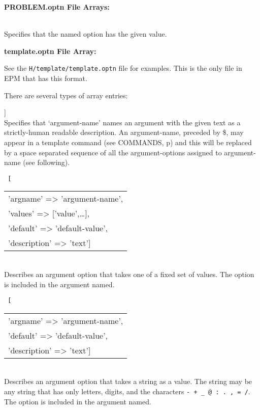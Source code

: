 \documentclass[12pt]{article}
\newenvironment{indpar}[1][0.4in]%
	{\begin{list}{}%
		     {\setlength{\itemsep}{0in}%
		      \setlength{\topsep}{0in}%
		      \setlength{\parsep}{1ex}%
		      \setlength{\labelwidth}{#1}%
		      \setlength{\leftmargin}{#1}%
		      \addtolength{\leftmargin}{\labelsep}}%
	 \item}%
	{\end{list}}
\newenvironment{itemlist}[1][0.2in]%
	{\begin{list}{}{\setlength{\labelwidth}{#1}%
		        \setlength{\leftmargin}{\labelwidth}%
		        \addtolength{\leftmargin}{+0.2in}%
		        \addtolength{\linewidth}{-\labelwidth}%
		        \addtolength{\linewidth}{-0.2in}%
		        \renewcommand{\makelabel}[1]{##1\hfill}}
	 \raggedright}%
	{\end{list}}
\newcommand{\pagref}[1]{p\pageref{#1}}
\begin{document}
{\bf PROBLEM.optn File Arrays:}

\begin{indpar}
\begin{itemlist}
\item[\tt 'option-name' => 'option-value'] ~ \\
Specifies that the named option has the given value.
\end{itemlist}
\end{indpar}

{\bf template.optn File Array:}
\label{TEMPLATE.OPTN}

\begin{indpar}
See the {\tt H/template/template.optn} file for examples.
This is the only file in EPM that has this format.

There are several types of array entries:
\begin{itemlist}

\item[\tt 'argument-name' => ['description' => 'text']] ~ \\
Specifies that `argument-name' names an argument with the
given text as a strictly-human readable description.
An argument-name, preceded by \$, may appear in a template
command (see COMMANDS, \pagref{TEMPLATE-COMMANDS}) and this
will be replaced by a space separated sequence of all the
argument-options assigned to
argument-name (see following).

\medskip

\newsavebox{\valoptbox}
\begin{lrbox}{\valoptbox}
\tt
[\begin{tabular}[t]{l}
'argname' => 'argument-name', \\
'values' => ['value',\ldots], \\
'default' => 'default-value', \\
'description' => 'text'] \\
\end{tabular}
\end{lrbox}
\item[\tt 'option-name' => \usebox{\valoptbox}] ~ \\
Describes an argument option that takes one of a fixed
set of values.  The option is included in the argument
named.

\medskip

\newsavebox{\argoptbox}
\begin{lrbox}{\argoptbox}
\tt
[\begin{tabular}[t]{l}
'argname' => 'argument-name', \\
'default' => 'default-value', \\
'description' => 'text'] \\
\end{tabular}
\end{lrbox}
\item[\tt 'option-name' => \usebox{\argoptbox}] ~ \\
Describes an argument option that takes a
string as a value.  The string may be any string
that has only letters,
digits, and the characters {\tt - + \_ @ : . , = /}.
The option is included in the argument named.


\end{itemlist}
\end{indpar}
\end{document}
